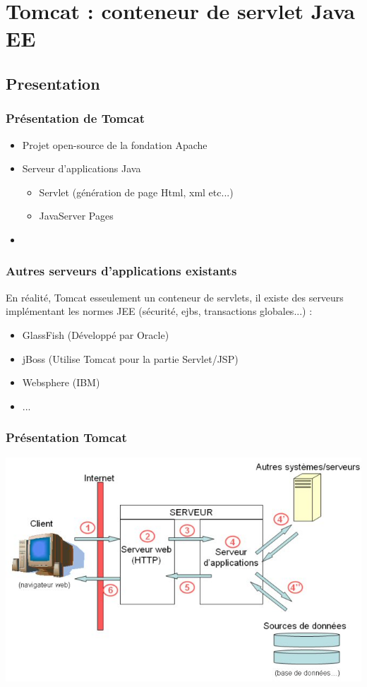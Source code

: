 \section{Tomcat : conteneur de servlet Java EE}
\subsection{Presentation}
\begin{frame}
  \frametitle{Présentation de Tomcat}

  \begin{itemize}
    \item Projet open-source de la fondation Apache
    \item Serveur d'applications Java
    \begin{itemize}
      \item Servlet (génération de page Html, xml etc...)
      \item JavaServer Pages
    \end{itemize}
    \item 
  \end{itemize}
\end{frame}

\begin{frame}
  \frametitle{Autres serveurs d'applications existants}
En réalité, Tomcat esseulement un conteneur de servlets, il existe des serveurs implémentant les normes JEE (sécurité, ejbs, transactions globales...) :
\begin{itemize} 
  \item GlassFish (Développé par Oracle)
  \item jBoss (Utilise Tomcat pour la partie Servlet/JSP)
  \item Websphere (IBM)
  \item ...
\end{itemize}
\end{frame}

\begin{frame}
  \frametitle{Présentation Tomcat}
  \includegraphics[scale=0.5]{Images/serveurapp.png}
\end{frame}

